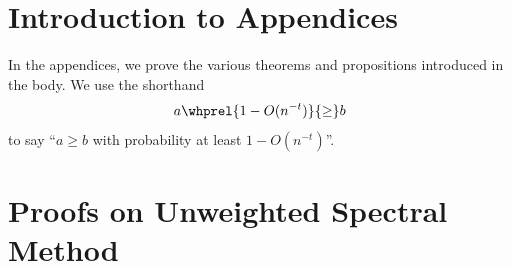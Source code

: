 \documentclass[sigconf,nonacm,pbalance]{acmart}
\newcounter{relctr} %
\begin{document}
\newcommand\labelawhprel[3]{%
  \begingroup
    \refstepcounter{relctr}%
    \!\!\stackrel[\mathclap{#1}]{\smash{\textnormal{(\alph{relctr})}}}{\boxed{#2}}%
    \originallabel{#3}%
  \endgroup
}
\section{Introduction to Appendices}
In the appendices, we prove the various theorems and propositions introduced in the body. We use the shorthand
\begin{equation}
a \whprel{1-O(n^{-t})}{\geq} b
\end{equation}
to say ``$a \geq b$ with probability at least $1-O(n^{-t})$''.

\section{Proofs on Unweighted Spectral Method}\label{app:proof-entry-wise-error-bounds-for-unweighted}
\end{document}
